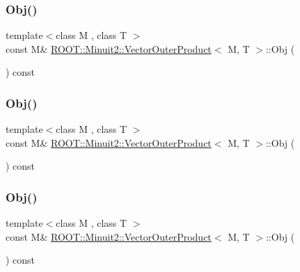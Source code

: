 \subsubsection{\texorpdfstring{Obj()}{Obj()}\hspace{0.1cm}{\footnotesize\ttfamily [1/3]}}
{\footnotesize\ttfamily template$<$class M , class T $>$ \\
const M\& \mbox{\hyperlink{classROOT_1_1Minuit2_1_1VectorOuterProduct}{R\+O\+O\+T\+::\+Minuit2\+::\+Vector\+Outer\+Product}}$<$ M, T $>$\+::Obj (\begin{DoxyParamCaption}{ }\end{DoxyParamCaption}) const\hspace{0.3cm}{\ttfamily [inline]}}

\mbox{\label{classROOT_1_1Minuit2_1_1VectorOuterProduct_a9326f6e70b3760159b6b74dded8311d3}} 
\subsubsection{\texorpdfstring{Obj()}{Obj()}\hspace{0.1cm}{\footnotesize\ttfamily [2/3]}}
{\footnotesize\ttfamily template$<$class M , class T $>$ \\
const M\& \mbox{\hyperlink{classROOT_1_1Minuit2_1_1VectorOuterProduct}{R\+O\+O\+T\+::\+Minuit2\+::\+Vector\+Outer\+Product}}$<$ M, T $>$\+::Obj (\begin{DoxyParamCaption}{ }\end{DoxyParamCaption}) const\hspace{0.3cm}{\ttfamily [inline]}}

\mbox{\label{classROOT_1_1Minuit2_1_1VectorOuterProduct_a9326f6e70b3760159b6b74dded8311d3}} 
\subsubsection{\texorpdfstring{Obj()}{Obj()}\hspace{0.1cm}{\footnotesize\ttfamily [3/3]}}
{\footnotesize\ttfamily template$<$class M , class T $>$ \\
const M\& \mbox{\hyperlink{classROOT_1_1Minuit2_1_1VectorOuterProduct}{R\+O\+O\+T\+::\+Minuit2\+::\+Vector\+Outer\+Product}}$<$ M, T $>$\+::Obj (\begin{DoxyParamCaption}{ }\end{DoxyParamCaption}) const\hspace{0.3cm}{\ttfamily [inline]}}



